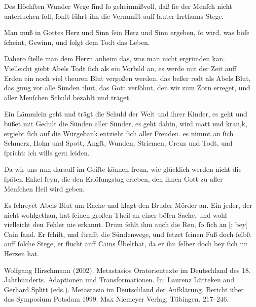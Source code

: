 \documentclass[tocstyle=ref-genre]{ees}
\begin{document}
{\begin{movement}{}
  \voice[Adam]
  Des Höchſten Wunder Wege
  ſind ſo geheimnißvoll,
  daß ſie der Menſch nicht unterſuchen ſoll,
  ſonſt führt ihn die Vernunfft auff lauter Irrthums Stege.
\end{movement}

\begin{movement}{}
  \voice[Chor]
  Man muß in Gottes Herz und Sinn
  ſein Herz und Sinn ergeben,
  ſo wird, was böſe ſcheint, Gewinn,
  und folgt dem Todt das Leben.
\end{movement}

\begin{movement}{}
  \voice[Adam]
  Dahero ſtelle man dem Herrn anheim
  das, was man nicht ergründen kan.
  Vielleicht giebt Abels Todt ſich als ein Vorbild an,
  es werde mit der Zeit auff Erden
  ein noch viel theuren Blut vergoßen werden,
  das beßer redt als Abels Blut,
  das gnug vor alle Sünden thut,
  das Gott verſöhnt, den wir zum Zorn erreget,
  und aller Menſchen Schuld bezahlt und träget.
\end{movement}

\begin{movement}{}
  \voice[Chor]
  Ein Lämmlein geht und trägt die Schuld
  der Welt und ihrer Kinder,
  es geht und büßet mit Gedult
  die Sünden aller Sünder,
  es geht dahin, wird matt und kran,k,
  ergiebt ſich auf die Würgebank
  entzieht ſich aller Freuden.
  es nimmt an ſich Schmerz, Hohn und Spott,
  Angſt, Wunden, Striemen, Creuz und Todt,
  und ſpricht: ich wills gern leiden.
\end{movement}

\begin{movement}{}
  \voice[Adam]
  Da wir uns nun darauff im Geiſte können freun,
  wie glücklich werden nicht die ſpäten Enkel ſeyn,
  die den Erlöſungstag erleben,
  den ihnen Gott
  zu aller Menſchen Heil wird geben.
\end{movement}

\begin{movement}{}
  \voice[Chor]
  Es ſchreyet Abels Blut um Rache
  und klagt den Bruder Mörder an.
  Ein jeder, der nicht wohlgethan,
  hat ſeinen großen Theil an einer böſen Sache,
  und wohl vielleicht den Fehler nie erkannt.
  Drum fehlt ihm auch die Reu, ſo ſich an [: bey] Cain fand.
  Er ſchilt, und ſtrafft die Sündenwege,
  und ſetzet ſeinen Fuß doch ſelbſt auff ſolche Stege,
  er flucht auff Cains Übelthat,
  da er ihn ſelber doch bey ſich im Herzen hat.
\end{movement}
}

\eesScore

Wolfgang Hirschmann (2002). Metastasios Oratorientexte im Deutschland des 18. Jahrhunderts. Adaptionen und Transformationen. In: Laurenz Lütteken and Gerhard Splitt (eds.). Metastasio im Deutschland der Aufklärung. Bericht über das Symposium Potsdam 1999. Max Niemeyer Verlag, Tübingen. 217–246.
\end{document}
